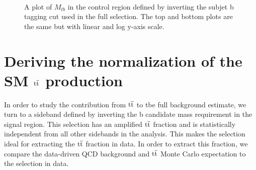 \begin{figure}[Htcb]
\centering
{}\\
\caption{A plot of $M_{tb}$ in the control region defined by inverting the subjet b tagging cut used in the full selection.  The top and bottom plots are the same but with linear and log y-axis scale.}
\label{figs:NewMtbSB3}
\end{figure}

\section{Deriving the normalization of the SM $\mathrm{t\overline{t}}$ production}
\label{sec:ttbarsideband}
In order to study the contribution from $\mathrm{t\overline{t}}$ to tbe full background estimate, we turn to a sideband defined by inverting the b candidate mass requirement in the signal region.
This selection has an amplified $\mathrm{t\overline{t}}$ fraction and is statistically independent from all other sidebands in the analysis.  
This makes the selection ideal for extracting the $\mathrm{t\overline{t}}$ fraction in data.  
In order to extract this fraction, we compare the data-driven QCD background and $\mathrm{t\overline{t}}$ Monte Carlo expectation to the selection in data.  

